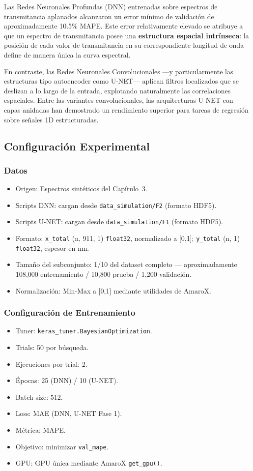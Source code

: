 \documentclass{article}
\begin{document}
Las Redes Neuronales Profundas (DNN) entrenadas sobre espectros de transmitancia aplanados alcanzaron un error mínimo de validación de aproximadamente 10.5\% MAPE. Este error relativamente elevado se atribuye a que un espectro de transmitancia posee una \textbf{estructura espacial intrínseca}: la posición de cada valor de transmitancia en su correspondiente longitud de onda define de manera única la curva espectral.

En contraste, las Redes Neuronales Convolucionales —y particularmente las estructuras tipo autoencoder como U-NET— aplican filtros localizados que se deslizan a lo largo de la entrada, explotando naturalmente las correlaciones espaciales. Entre las variantes convolucionales, las arquitecturas U-NET con capas anidadas han demostrado un rendimiento superior para tareas de regresión sobre señales 1D estructuradas.

\subsection{Configuración Experimental}

\subsubsection{Datos}
\begin{itemize}
\item Origen: Espectros sintéticos del Capítulo~3.
\item Scripts DNN: cargan desde \texttt{data\_simulation/F2} (formato HDF5).
\item Scripts U-NET: cargan desde \texttt{data\_simulation/F1} (formato HDF5).
\item Formato: \texttt{x\_total} (n, 911, 1) \texttt{float32}, normalizado a [0,1]; \texttt{y\_total} (n, 1) \texttt{float32}, espesor en nm.
\item Tamaño del subconjunto: 1/10 del dataset completo — aproximadamente 108,000 entrenamiento / 10,800 prueba / 1,200 validación.
\item Normalización: Min-Max a [0,1] mediante utilidades de AmaroX.
\end{itemize}

\subsubsection{Configuración de Entrenamiento}
\begin{itemize}
\item Tuner: \texttt{keras\_tuner.BayesianOptimization}.
\item Trials: 50 por búsqueda.
\item Ejecuciones por trial: 2.
\item Épocas: 25 (DNN) / 10 (U-NET).
\item Batch size: 512.
\item Loss: MAE (DNN, U-NET Fase 1).
\item Métrica: MAPE.
\item Objetivo: minimizar \texttt{val\_mape}.
\item GPU: GPU única mediante AmaroX \texttt{get\_gpu()}.
\end{itemize}
\end{document}
